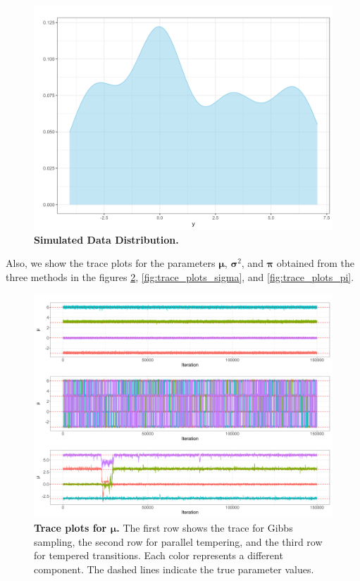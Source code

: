 \documentclass[11pt]{article}
\newcommand{\bpi}{\boldsymbol{\pi}}
\newcommand{\bmu}{\boldsymbol{\mu}}
\newcommand{\bsigma}{\boldsymbol{\sigma}}
\begin{document}
\begin{figure}[!ht]
    \centering
    \includegraphics[scale=0.6]{figures/data_plot_random_beta.png}
    \caption{\textbf{Simulated Data Distribution.}}
    \label{fig:data_distribution}
\end{figure}

Also, we show the trace plots for the parameters $\bmu$, $\bsigma^2$, and $\bpi$ obtained from the three methods
in the figures \ref{fig:trace_plots_mu}, \ref{fig:trace_plots_sigma}, and \ref{fig:trace_plots_pi}.

\begin{figure}[!ht]
    \centering
    \includegraphics[scale=0.4]{figures/trace_mu_random_beta.png}
    \caption{\textbf{Trace plots for $\bmu$.} The first row shows the trace for Gibbs sampling, the second row for
    parallel tempering, and the third row for tempered transitions. Each color represents a different component. 
    The dashed lines indicate the true parameter values.}
    \label{fig:trace_plots_mu}
\end{figure}
\end{document}
